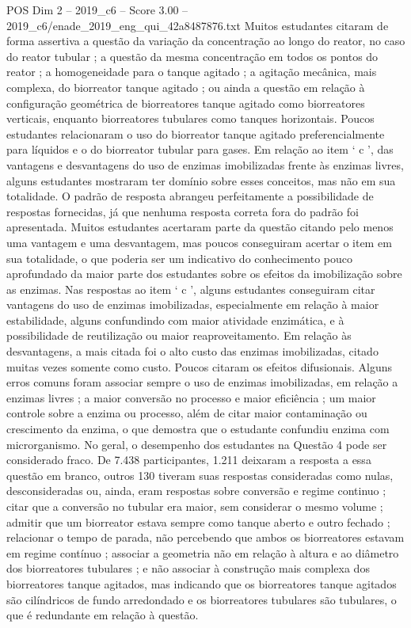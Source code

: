 \begin{textsample}{POS Dim 2 – 2019\_c6 – Score 3.00 – 2019\_c6/enade\_2019\_eng\_qui\_42a8487876.txt}
Muitos estudantes citaram de forma assertiva a questão da variação da concentração ao longo do reator, no caso do reator tubular ; a questão da mesma concentração em todos os pontos do reator ; a homogeneidade para o tanque agitado ; a agitação mecânica, mais complexa, do biorreator tanque agitado ; ou ainda a questão em relação à configuração geométrica de biorreatores tanque agitado como biorreatores verticais, enquanto biorreatores tubulares como tanques horizontais.
Poucos estudantes relacionaram o uso do biorreator tanque agitado preferencialmente para líquidos e o do biorreator tubular para gases.
Em relação ao item ‘ c ’, das vantagens e desvantagens do uso de enzimas imobilizadas frente às enzimas livres, alguns estudantes mostraram ter domínio sobre esses conceitos, mas não em sua totalidade.
O padrão de resposta abrangeu perfeitamente a possibilidade de respostas fornecidas, já que nenhuma resposta correta fora do padrão foi apresentada.
Muitos estudantes acertaram parte da questão citando pelo menos uma vantagem e uma desvantagem, mas poucos conseguiram acertar o item em sua totalidade, o que poderia ser um indicativo do conhecimento pouco aprofundado da maior parte dos estudantes sobre os efeitos da imobilização sobre as enzimas.
Nas respostas ao item ‘ c ’, alguns estudantes conseguiram citar vantagens do uso de enzimas imobilizadas, especialmente em relação à maior estabilidade, alguns confundindo com maior atividade enzimática, e à possibilidade de reutilização ou maior reaproveitamento.
Em relação às desvantagens, a mais citada foi o alto custo das enzimas imobilizadas, citado muitas vezes somente como custo.
Poucos citaram os efeitos difusionais.
Alguns erros comuns foram associar sempre o uso de enzimas imobilizadas, em relação a enzimas livres ; a maior conversão no processo e maior eficiência ; um maior controle sobre a enzima ou processo, além de citar maior contaminação ou crescimento da enzima, o que demostra que o estudante confundiu enzima com microrganismo.
No geral, o desempenho dos estudantes na Questão 4 pode ser considerado fraco.
De 7.438 participantes, 1.211 deixaram a resposta a essa questão em branco, outros 130 tiveram suas respostas consideradas como nulas, desconsideradas ou, ainda, eram respostas sobre conversão e regime continuo ; citar que a conversão no tubular era maior, sem considerar o mesmo volume ; admitir que um biorreator estava sempre como tanque aberto e outro fechado ; relacionar o tempo de parada, não percebendo que ambos os biorreatores estavam em regime contínuo ; associar a geometria não em relação à altura e ao diâmetro dos biorreatores tubulares ; e não associar à construção mais complexa dos biorreatores tanque agitados, mas indicando que os biorreatores tanque agitados são cilíndricos de fundo arredondado e os biorreatores tubulares são tubulares, o que é redundante em relação à questão.

\end{textsample}
